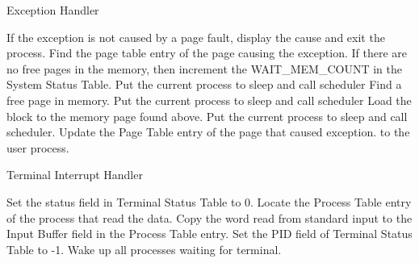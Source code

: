 
\begin{algorithm}
\caption{Exception Handler}
\begin{algorithmic}
\STATE If the exception is not caused by a page fault, display the cause and exit the process.
\STATE Find the page table entry of the page causing the exception.
\STATE If there are no free pages in the memory, then increment the WAIT\_MEM\_COUNT in the System Status Table.
    \STATE Put the current process to sleep and call scheduler
\ENDWHILE
\STATE Find a free page in memory.
        \STATE Put the current process to sleep and call scheduler
    \ENDWHILE
    \STATE Load the block to the memory page found above.
    \STATE Put the current process to sleep and call scheduler.
\ENDIF
\STATE Update the Page Table entry of the page that caused exception. 
\RETURN to the user process.
\end{algorithmic}
\end{algorithm}


\begin{algorithm}
\caption{Terminal Interrupt Handler}
\begin{algorithmic}
\STATE Set the status field in Terminal Status Table to 0.
\STATE Locate the Process Table entry of the process that read the data.
\STATE Copy the word read from standard input to the Input Buffer field in the Process Table entry.
\STATE Set the PID field of Terminal Status Table to -1.
\STATE Wake up all processes waiting for terminal.
\end{algorithmic}
\end{algorithm}




